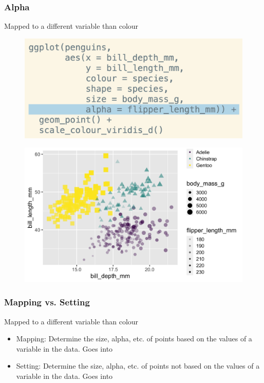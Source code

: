 \documentclass[11pt]{beamer}
\begin{document}
\begin{frame}
	\frametitle{\textbf{Alpha}}
	Mapped to a different variable than colour
	
	\begin{minipage}[t]{0.5\linewidth}
		\begin{figure}
			\centering
			\includegraphics[width=1\linewidth]{Images/S2/code/s21}
			
		\end{figure}
	\end{minipage}%
	\begin{minipage}[t]{0.5\linewidth}
		
		\begin{figure}
			\centering
			\includegraphics[width=1\linewidth]{Images/S2/alpha-1}
			
		\end{figure}
		
		
	\end{minipage}
	
	
\end{frame}
\begin{frame}
	\frametitle{\textbf{Mapping vs. Setting}}
	Mapped to a different variable than colour
	
	\begin{itemize}
		\item Mapping: Determine the size, alpha, etc. of points based on the values of a variable in the data. Goes into 
		\item Setting: Determine the size, alpha, etc. of points not based on the values of a variable in the data. Goes into  
	\end{itemize}
	
\end{frame}
\end{document}
